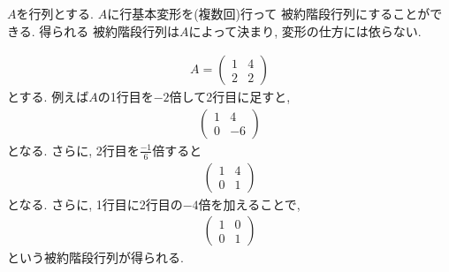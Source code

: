 \begin{theorem}
  \label{thm:unique:reducedecheron}
  $A$を行列とする.
  $A$に行基本変形を(複数回)行って
  被約階段行列にすることができる.
  得られる
  被約階段行列は$A$によって決まり,
  変形の仕方には依らない.
\end{theorem}
\begin{example}
  \begin{align*}
    A=\begin{pmatrix}1&4\\2&2\end{pmatrix}
  \end{align*}
  とする.
  例えば$A$の1行目を$-2$倍して2行目に足すと,
  \begin{align*}
    \begin{pmatrix}1&4\\0&-6\end{pmatrix}
  \end{align*}
  となる.
  さらに, 2行目を$\frac{-1}{6}$倍すると
  \begin{align*}
    \begin{pmatrix}1&4\\0&1\end{pmatrix}
  \end{align*}
  となる.
  さらに, 1行目に2行目の$-4$倍を加えることで,
 \begin{align*}
   \begin{pmatrix}1&0\\0&1\end{pmatrix}
  \end{align*}
 という被約階段行列が得られる.


\end{example}
